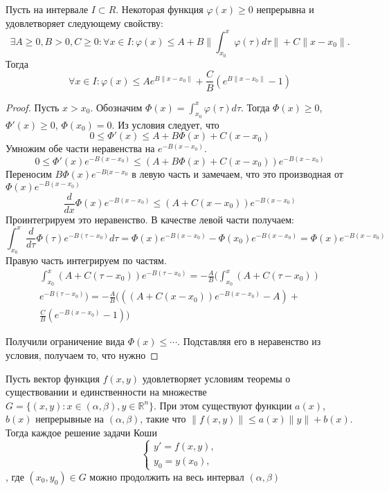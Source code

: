 \documentclass[document.tex]{subfiles}
\begin{document}
\begin{lemma}
    Пусть на интервале $I \subset R$. Некоторая функция $\varphi(x) \geq 0$ непрерывна и удовлетворяет следующему
    свойству:
    \[
        \exists A \geq 0, B > 0, C \geq 0:
        \forall x \in I: \varphi(x) \leq A + B \| \int_{x_0}^{x} \varphi(\tau) d\tau \| + C \|x - x_0\|.
    \]
    Тогда
    \[
        \forall x \in I : \varphi(x) \leq A e^{B \|x - x_0 \|} + \frac{C}{B} (e^{B\|x - x_0\|} - 1)
    \]
\end{lemma}
\begin{proof}
    Пусть $x > x_0$. Обозначим $\Phi(x) = \int_{x_0}^{x}\varphi(\tau) d\tau$. Тогда $\Phi(x) \geq 0$, $\Phi'(x) \geq
    0$, $\Phi(x_0) = 0$. Из условия следует, что 
    \[
        0 \leq \Phi'(x) \leq A + B \Phi(x) + C(x - x_0)
    \]
    Умножим обе части неравенства на $e^{-B(x - x_0)}$.
    \[
        0 \leq \Phi'(x) e^{-B(x - x_0)} \leq  (A + B \Phi(x) + C(x - x_0)) e^{-B(x - x_0)}
    \]
    Переносим $B \Phi(x) e^{-B(x - x_0}$ в левую часть и замечаем, что это производная от $\Phi(x) e^{-B(x - x_0)}$
    \[
        \frac{d}{dx} \Phi(x) e^{-B(x - x_0)} \leq (A + C(x - x_0)) e^{-B(x - x_0)}
    \]
    Проинтегрируем это неравенство. В качестве левой части получаем:
    \[
        \int_{x_0}^{x} \frac{d}{d\tau} \Phi(\tau) e^{-B(\tau - x_0)} d \tau = \Phi(x) e^{-B(x - x_0)} - \Phi(x_0)
        e^{-B(x - x_0)} = \Phi(x) e^{-B(x - x_0)}
    \]
    Правую часть интегрируем по частям. 
    \begin{multline*}
        \int_{x_0}^{x} (A + C(\tau - x_0)) e^{-B(\tau - x_0)} = -\frac{A}{B} ( \int_{x_0}^{x} (A + C(\tau - x_0))
            \\
        e^{-B(\tau - x_0)} ) = -\frac{A}{B} (  ( (A + C(x - x_0)) e^{-B(x - x_0)} - A) + \\
        \frac{C}{B} (e^{-B(x - x_0)} - 1) )
    \end{multline*}

    Получили ограничение вида $\Phi(x) \leq \cdots$. Подставляя его в неравенство из условия, получаем то, что нужно
\end{proof}

\begin{theorem}
    Пусть вектор функция $f(x, y)$ удовлетворяет условиям теоремы о существовании и единственности на множестве $G = \{(x,
        y): x \in (\alpha, \beta), y \in \mathbb{R}^{n}\}$. При этом существуют функции $a(x)$, $b(x)$ непрерывные на
        $(\alpha, \beta)$, такие что $\|f(x, y)\| \leq a(x)\|y\| + b(x)$. Тогда каждое решение задачи Коши 
        \[
            \begin{cases}
                y' = f(x, y), \\
                y_0 = y(x_0),
            \end{cases}
        \]
        , где $(x_0, y_0) \in G$ можно продолжить на весь интервал $(\alpha, \beta)$
\end{theorem}
\end{document}
